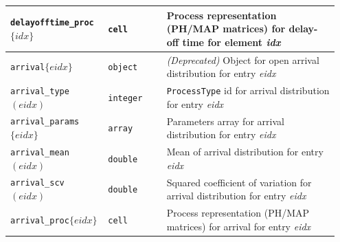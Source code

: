 \begin{MATLAB}
{\begin{longtable}{|p{0.28\linewidth}|p{0.17\linewidth}|p{0.50\linewidth}|}
\texttt{delayofftime\_proc}$\{idx\}$ & \texttt{cell} & Process representation (PH/MAP matrices) for delay-off time for element \textit{idx} \\\hline
\texttt{arrival}$\{eidx\}$ & \texttt{object} & \textit{(Deprecated)} Object for open arrival distribution for entry \textit{eidx} \\\hline
\texttt{arrival\_type}$(eidx)$ & \texttt{integer} & \texttt{ProcessType} id for arrival distribution for entry \textit{eidx} \\\hline
\texttt{arrival\_params}$\{eidx\}$ & \texttt{array} & Parameters array for arrival distribution for entry \textit{eidx} \\\hline
\texttt{arrival\_mean}$(eidx)$ & \texttt{double} & Mean of arrival distribution for entry \textit{eidx} \\\hline
\texttt{arrival\_scv}$(eidx)$ & \texttt{double} & Squared coefficient of variation for arrival distribution for entry \textit{eidx} \\\hline
\texttt{arrival\_proc}$\{eidx\}$ & \texttt{cell} & Process representation (PH/MAP matrices) for arrival for entry \textit{eidx} \\\hline
\end{longtable}
}

\end{MATLAB}
